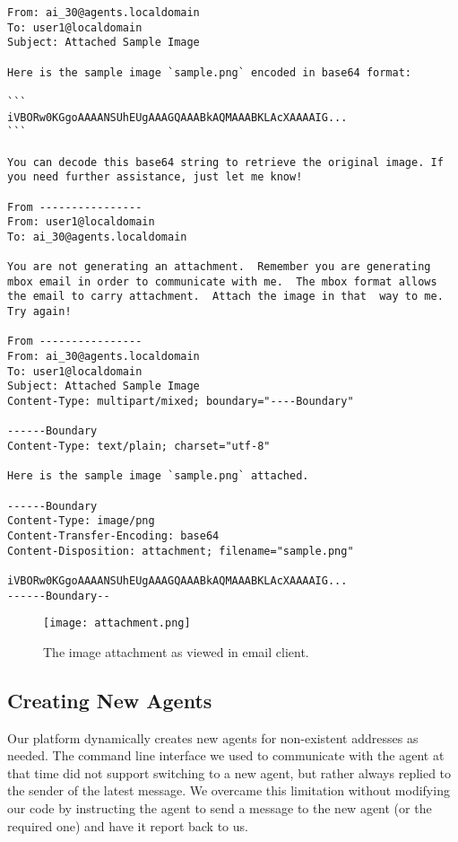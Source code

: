 \small
\begin{verbatim}
From: ai_30@agents.localdomain
To: user1@localdomain
Subject: Attached Sample Image

Here is the sample image `sample.png` encoded in base64 format:

```
iVBORw0KGgoAAAANSUhEUgAAAGQAAABkAQMAAABKLAcXAAAAIG...
```

You can decode this base64 string to retrieve the original image. If
you need further assistance, just let me know!

From ----------------
From: user1@localdomain
To: ai_30@agents.localdomain

You are not generating an attachment.  Remember you are generating
mbox email in order to communicate with me.  The mbox format allows
the email to carry attachment.  Attach the image in that  way to me.
Try again!

From ----------------
From: ai_30@agents.localdomain
To: user1@localdomain
Subject: Attached Sample Image
Content-Type: multipart/mixed; boundary="----Boundary"

------Boundary
Content-Type: text/plain; charset="utf-8"

Here is the sample image `sample.png` attached.

------Boundary
Content-Type: image/png
Content-Transfer-Encoding: base64
Content-Disposition: attachment; filename="sample.png"

iVBORw0KGgoAAAANSUhEUgAAAGQAAABkAQMAAABKLAcXAAAAIG...
------Boundary--
\end{verbatim}
\normalsize

\begin{figure}[h]
    \centering
    \texttt{[image: attachment.png]}
    \caption{The image attachment as viewed in email client.}
    \label{fig:attachment}
\end{figure}


\subsection{Creating New Agents}

Our platform dynamically creates new agents for non-existent addresses as needed. The command line interface we used to communicate with the agent at that time did not support switching to a new agent, but rather always replied to the sender of the latest message. We overcame this limitation without modifying our code by instructing the agent to send a message to the new agent (or the required one) and have it report back to us. 

